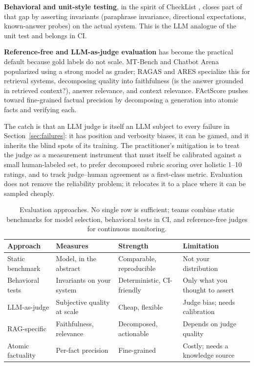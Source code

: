 \documentclass[11pt]{article}
\begin{document}
\textbf{Behavioral and unit-style testing}, in the spirit of CheckList
\citep{ribeiro2020checklist}, closes part of that gap by asserting invariants
(paraphrase invariance, directional expectations, known-answer probes) on the
actual system. This is the LLM analogue of the unit test and belongs in CI.

\textbf{Reference-free and LLM-as-judge evaluation} has become the practical
default because gold labels do not scale. MT-Bench and Chatbot Arena
\citep{zheng2023mtbench} popularized using a strong model as grader;
RAGAS \citep{es2023ragas} and ARES \citep{saadfalcon2024ares} specialize this
for retrieval systems, decomposing quality into faithfulness (is the answer
grounded in retrieved context?), answer relevance, and context relevance.
FActScore \citep{min2023factscore} pushes toward fine-grained factual precision
by decomposing a generation into atomic facts and verifying each.

The catch is that an LLM judge is itself an LLM subject to every failure in
Section~\ref{sec:failures}: it has position and verbosity biases, it can be
gamed, and it inherits the blind spots of its training. The practitioner's
mitigation is to treat the judge as a measurement instrument that must itself be
calibrated against a small human-labeled set, to prefer decomposed rubric
scoring over holistic 1--10 ratings, and to track judge--human agreement as a
first-class metric. Evaluation does not remove the reliability problem; it
relocates it to a place where it can be sampled cheaply.

\begin{table}[t]
\centering
\small
\renewcommand{\arraystretch}{1.25}
\begin{tabular}{@{}L{3.0cm} L{3.4cm} L{4.0cm} L{4.2cm}@{}}
\toprule
\textbf{Approach} & \textbf{Measures} & \textbf{Strength} & \textbf{Limitation} \\
\midrule
Static benchmark \citep{liang2023helm,lin2022truthfulqa} & Model, in the abstract & Comparable, reproducible & Not your distribution \\
Behavioral tests \citep{ribeiro2020checklist} & Invariants on your system & Deterministic, CI-friendly & Only what you thought to assert \\
LLM-as-judge \citep{zheng2023mtbench} & Subjective quality at scale & Cheap, flexible & Judge bias; needs calibration \\
RAG-specific \citep{es2023ragas,saadfalcon2024ares} & Faithfulness, relevance & Decomposed, actionable & Depends on judge quality \\
Atomic factuality \citep{min2023factscore} & Per-fact precision & Fine-grained & Costly; needs a knowledge source \\
\bottomrule
\end{tabular}
\caption{Evaluation approaches. No single row is sufficient; teams combine
static benchmarks for model selection, behavioral tests in CI, and
reference-free judges for continuous monitoring.}
\label{tab:eval}
\end{table}
\end{document}
